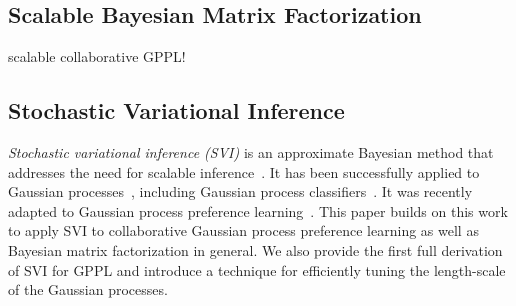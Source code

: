 
\subsection{Scalable Bayesian Matrix Factorization}

\cite{khan2014scalable} scalable collaborative GPPL!

\subsection{Stochastic Variational Inference}

\emph{Stochastic variational inference (SVI)} is an approximate Bayesian method that addresses the need for scalable inference~\cite{hoffman2013stochastic}. It has been successfully applied to Gaussian processes~\cite{hensman_scalable_2015}, including Gaussian process classifiers~\cite{hensman_scalable_2015}.
It was recently adapted to Gaussian process preference learning~\cite{simpson2018finding}.
This paper builds on this work to apply SVI to collaborative Gaussian process preference learning
as well as Bayesian matrix factorization in general. We also provide the first full derivation of SVI for GPPL
and introduce a technique for efficiently tuning the length-scale of the Gaussian processes.